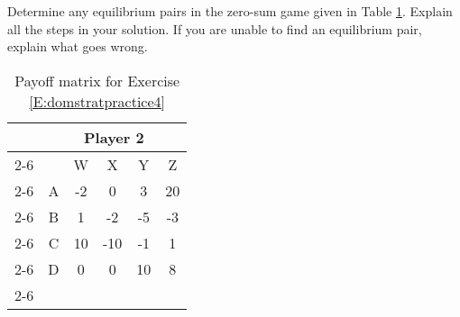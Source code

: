 \begin{xca}\label{E:domstratpractice4} Determine any equilibrium pairs in the zero-sum game given in Table \ref{T:domstratpractice4}.  Explain all the steps in your solution. If you are unable to find an equilibrium pair, explain what goes wrong.





\begin{table}[h]
\centering
\begin{tabular}{lccccc}
                      & \multicolumn{5}{c}{Player 2}                                                                                                  \\ \cline{2-6} 
\multicolumn{1}{l|}{} & \multicolumn{1}{c|}{} & \multicolumn{1}{c|}{W} & \multicolumn{1}{c|}{X} & \multicolumn{1}{c|}{Y} & \multicolumn{1}{c|}{Z} \\ \cline{2-6} 
\multicolumn{1}{l|}{Player 1} & \multicolumn{1}{c|}{A} & \multicolumn{1}{c|}{-2} & \multicolumn{1}{c|}{0} & \multicolumn{1}{c|}{3} & \multicolumn{1}{c|}{20} \\ \cline{2-6} 
\multicolumn{1}{l|}{} & \multicolumn{1}{c|}{B} & \multicolumn{1}{c|}{1} & \multicolumn{1}{c|}{-2} & \multicolumn{1}{c|}{-5} & \multicolumn{1}{c|}{-3} \\ \cline{2-6} 
\multicolumn{1}{l|}{} & \multicolumn{1}{c|}{C} & \multicolumn{1}{c|}{10} & \multicolumn{1}{c|}{-10} & \multicolumn{1}{c|}{-1} & \multicolumn{1}{c|}{1} \\ \cline{2-6} 
\multicolumn{1}{l|}{} & \multicolumn{1}{c|}{D} & \multicolumn{1}{c|}{0} & \multicolumn{1}{c|}{0} & \multicolumn{1}{c|}{10} & \multicolumn{1}{c|}{8} \\ \cline{2-6} 
\end{tabular}
\caption{Payoff matrix for Exercise \ref{E:domstratpractice4}}
\label{T:domstratpractice4}

\end{table}
\end{xca}


